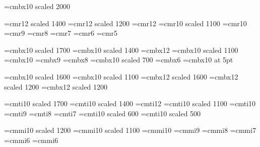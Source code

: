 ﻿%

%

\def\Font #1@#2pt{\font\Fonteol=ec#1 at #2pt\Fonteol}

\font\LD@Font@Book=cmbx10 scaled 2000\relax 
%
% 
%
%

% 

\font\seventeenrm=cmr12 scaled 1400
\font\fourteenrm=cmr12 scaled 1200
\font\twelverm=cmr12
\font\elevenrm=cmr10 scaled 1100
\font\tenrm=cmr10
\font\ninerm=cmr9
\font\eightrm=cmr8
\font\sevenrm=cmr7
\font\sixrm=cmr6
\font\fiverm=cmr5

% 

\font\seventeenbf=cmbx10 scaled 1700
\font\fourteenbf=cmbx10 scaled 1400
\font\twelvebf=cmbx12
\font\elevenbf=cmbx10 scaled 1100
\font\tenbf=cmbx10
\font\ninebf=cmbx9
\font\eightbf=cmbx8
\font\sevenbf=cmbx10 scaled 700
\font\sixbf=cmbx6
\font\fivebf=cmbx10 at 5pt

\font\chiffre=cmbx10 scaled 1600
\font\gras=cmbx10 scaled 1100             %
\font\TIT=cmbx12 scaled 1600              %
\font\titre=cmbx12 scaled 1200
\font\pti=cmbx12 scaled 1200

% 

\font\seventeenit=cmti10 scaled 1700
\font\fourteenit=cmti10 scaled 1400
\font\twelveit=cmti12
\font\elevenit=cmti10 scaled 1100
\font\tenit=cmti10
\font\nineit=cmti9
\font\eightit=cmti8
\font\sevenit=cmti7
\font\sixit=cmti10 scaled 600
\font\fiveit=cmti10 scaled 500

% 

\font\twelvei=cmmi10 scaled 1200
\font\eleveni=cmmi10 scaled 1100
\font\teni=cmmi10
\font\ninei=cmmi9
\font\eighti=cmmi8
\font\seveni=cmmi7
\font\sixi=cmmi6
\font\fivei=cmmi6

